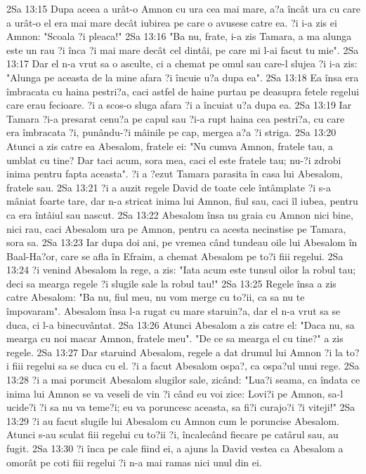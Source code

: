 2Sa 13:15  Dupa aceea a urât-o Amnon cu ura cea mai mare, a?a încât ura cu care a urât-o el era mai mare decât iubirea pe care o avusese catre ea. ?i i-a zis ei Amnon: "Scoala ?i pleaca!"
2Sa 13:16  "Ba nu, frate, i-a zis Tamara, a ma alunga este un rau ?i înca ?i mai mare decât cel dintâi, pe care mi l-ai facut tu mie".
2Sa 13:17  Dar el n-a vrut sa o asculte, ci a chemat pe omul sau care-l slujea ?i i-a zis: "Alunga pe aceasta de la mine afara ?i încuie u?a dupa ea".
2Sa 13:18  Ea însa era îmbracata cu haina pestri?a, caci astfel de haine purtau pe deasupra fetele regelui care erau fecioare. ?i a scos-o sluga afara ?i a încuiat u?a dupa ea.
2Sa 13:19  Iar Tamara ?i-a presarat cenu?a pe capul sau ?i-a rupt haina cea pestri?a, cu care era îmbracata ?i, punându-?i mâinile pe cap, mergea a?a ?i striga.
2Sa 13:20  Atunci a zis catre ea Abesalom, fratele ei: "Nu cumva Amnon, fratele tau, a umblat cu tine? Dar taci acum, sora mea, caci el este fratele tau; nu-?i zdrobi inima pentru fapta aceasta". ?i a ?ezut Tamara parasita în casa lui Abesalom, fratele sau.
2Sa 13:21  ?i a auzit regele David de toate cele întâmplate ?i s-a mâniat foarte tare, dar n-a stricat inima lui Amnon, fiul sau, caci îl iubea, pentru ca era întâiul sau nascut.
2Sa 13:22  Abesalom însa nu graia cu Amnon nici bine, nici rau, caci Abesalom ura pe Amnon, pentru ca acesta necinstise pe Tamara, sora sa.
2Sa 13:23  Iar dupa doi ani, pe vremea când tundeau oile lui Abesalom în Baal-Ha?or, care se afla în Efraim, a chemat Abesalom pe to?i fiii regelui.
2Sa 13:24  ?i venind Abesalom la rege, a zis: "Iata acum este tunsul oilor la robul tau; deci sa mearga regele ?i slugile sale la robul tau!"
2Sa 13:25  Regele însa a zis catre Abesalom: "Ba nu, fiul meu, nu vom merge cu to?ii, ca sa nu te împovaram". Abesalom însa l-a rugat cu mare staruin?a, dar el n-a vrut sa se duca, ci l-a binecuvântat.
2Sa 13:26  Atunci Abesalom a zis catre el: "Daca nu, sa mearga cu noi macar Amnon, fratele meu". "De ce sa mearga el cu tine?" a zis regele.
2Sa 13:27  Dar staruind Abesalom, regele a dat drumul lui Amnon ?i la to?i fiii regelui sa se duca cu el. ?i a facut Abesalom ospa?, ca ospa?ul unui rege.
2Sa 13:28  ?i a mai poruncit Abesalom slugilor sale, zicând: "Lua?i seama, ca îndata ce inima lui Amnon se va veseli de vin ?i când eu voi zice: Lovi?i pe Amnon, sa-l ucide?i ?i sa nu va teme?i; eu va poruncesc aceasta, sa fi?i curajo?i ?i viteji!"
2Sa 13:29  ?i au facut slugile lui Abesalom cu Amnon cum le poruncise Abesalom. Atunci s-au sculat fiii regelui cu to?ii ?i, încalecând fiecare pe catârul sau, au fugit.
2Sa 13:30  ?i înca pe cale fiind ei, a ajuns la David vestea ca Abesalom a omorât pe coti fiii regelui ?i n-a mai ramas nici unul din ei.
